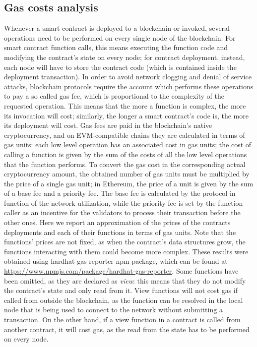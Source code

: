 \documentclass[english, LaM, oneside]{sapthesis}%
\begin{document}
\subsection{Gas costs analysis}
Whenever a smart contract is deployed to a blockchain or invoked, several operations need to be performed on every single node of the blockchain. For smart contract function calls, this means executing the function code and modifying the contract's state on every node; for contract deployment, instead, each node will have to store the contract code (which is contained inside the deployment transaction). In order to avoid network clogging and denial of service attacks, blockchain protocols require the account which performs these operations to pay a so called gas fee, which is proportional to the complexity of the requested operation. This means that the more a function is complex, the more its invocation will cost; similarly, the longer a smart contract's code is, the more its deployment will cost.\newline
Gas fees are paid in the blockchain's native cryptocurrency, and on EVM-compatible chains they are calculated in terms of gas units: each low level operation has an associated cost in gas units; the cost of calling a function is given by the sum of the costs of all the low level operations that the function performs. To convert the gas cost in the corresponding actual cryptocurrency amount, the obtained number of gas units must be multiplied by the price of a single gas unit; in Ethereum, the price of a unit is given by the sum of a base fee and a priority fee. The base fee is calculated by the protocol in function of the network utilization, while the priority fee is set by the function caller as an incentive for the validators to process their transaction before the other ones.\newline
Here we report an approximation of the prices of the contracts deployments and each of their functions in terms of gas units. Note that the functions' prices are not fixed, as when the contract's data structures grow, the functions interacting with them could become more complex. These results were obtained using hardhat-gas-reporter npm package, which can be found at \url{https://www.npmjs.com/package/hardhat-gas-reporter}. \newline
Some functions have been omitted, as they are declared as \textit{view}: this means that they do not modify the contract's state and only read from it. View functions will not cost gas if called from outside the blockchain, as the function can be resolved in the local node that is being used to connect to the network without submitting a transaction. On the other hand, if a view function in a contract is called from another contract, it will cost gas, as the read from the state has to be performed on every node. \newline
\end{document}
